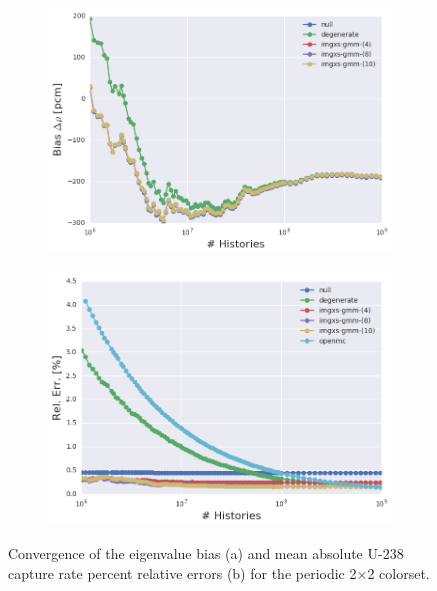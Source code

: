 \documentclass[12pt,twoside]{mitthesis-exec}
\begin{document}
\begin{figure}[h!]
\centering
\begin{subfigure}{\textwidth}
  \centering
  \includegraphics[width=0.87\linewidth]{figures/results/convergence/2x2/keff-bias-evo}
  \caption{}
  \label{fig:2x2-eigenvalue-converge}
\end{subfigure}
\begin{subfigure}{\textwidth}
  \centering
  \includegraphics[width=0.9\linewidth]{figures/results/convergence/2x2/mean-capt-err-evo}
  \caption{}
  \label{fig:2x2-capture-converge-mean}
\end{subfigure}
\vspace{2mm}
\caption[Fission rate covergence for the periodic 2$\times$2 colorset]{Convergence of the eigenvalue bias (a) and mean absolute U-238 capture rate percent relative errors (b) for the periodic 2$\times$2 colorset.}
\label{fig:2x2-capture-converge}
\end{figure}
\end{document}
